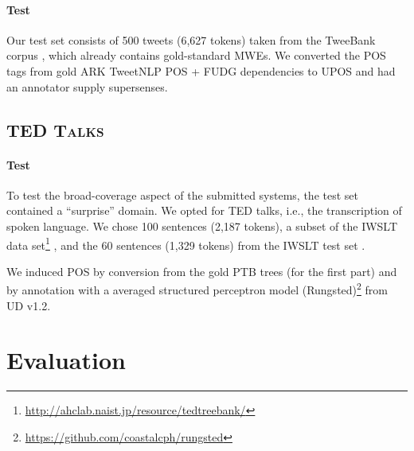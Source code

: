 \documentclass[11pt,letterpaper]{article}
\newcommand{\ensuretext}[1]{#1}
\newcommand{\nssmarker}{\ensuretext{\textcolor{magenta}{\ensuremath{^{\textsc{NS}}_{\textsc{S}}}}}}
\newcommand{\arkcomment}[3]{\ensuretext{\textcolor{#3}{[#1 #2]}}}
\newcommand{\nss}[1]{\arkcomment{\nssmarker}{#1}{magenta}}
\newcommand{\finalversion}[1]{}
\newcommand{\longversion}[1]{#1} %
\begin{document}
\paragraph{Test}
Our test set consists of 500 tweets (6,627 tokens) taken from the TweeBank corpus \citep{kong-14}, which already contains gold-standard MWEs. We converted the POS tags from gold ARK TweetNLP POS + FUDG dependencies to UPOS and had an annotator supply supersenses.


\subsection{\textsc{TED Talks}}
\paragraph{Test}
To test the broad-coverage aspect of the submitted systems, the test set contained a ``surprise'' domain. We opted for TED talks, i.e., the transcription of spoken language. We chose 100 sentences (2,187 tokens), a subset of the IWSLT data set\footnote{\url{http://ahclab.naist.jp/resource/tedtreebank/}}  \citet{neubig-2014naist}, and the 60 sentences (1,329 tokens) from the IWSLT test set \citep{cettolo-2012wit3}.

We induced POS by conversion from the gold PTB trees (for the first part) and by annotation with a averaged structured perceptron model (Rungsted)\footnote{\url{https://github.com/coastalcph/rungsted}} from UD v1.2.


\section{Evaluation}\label{sec:eval}
\longversion{
\finalversion{\subsection{\nss{TODO}System Submission Process}

On May~5,~2015, teams will be furnished with the test data (minus the gold labels). 
They will have until May~10 to submit up to 3~system predictions for evaluation. 
The test data will include sentences from both evaluation domains, 
in a random order: to encourage robust systems, 
the domain of each sentence will not be marked at test time, 
and the proportion of sentences from each domain is not guaranteed to be 
the same in the trial, train, dev, and test sets.\nss{is this crazy?}}
}
\end{document}
